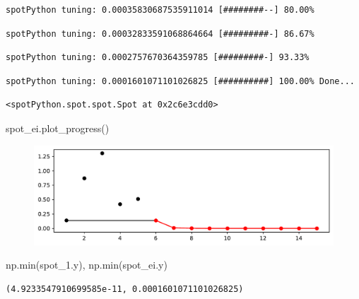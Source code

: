 \documentclass[
  letterpaper,
  DIV=11,
  numbers=noendperiod]{scrreprt}
\newenvironment{Shaded}{\begin{snugshade}}{\end{snugshade}}
\newcommand{\BuiltInTok}[1]{\textcolor[rgb]{0.00,0.23,0.31}{#1}}
\newcommand{\NormalTok}[1]{\textcolor[rgb]{0.00,0.23,0.31}{#1}}
\begin{document}
\begin{verbatim}
spotPython tuning: 0.00035830687535911014 [########--] 80.00% 
\end{verbatim}

\begin{verbatim}
spotPython tuning: 0.00032833591068864664 [#########-] 86.67% 
\end{verbatim}

\begin{verbatim}
spotPython tuning: 0.0002757670364359785 [#########-] 93.33% 
\end{verbatim}

\begin{verbatim}
spotPython tuning: 0.0001601071101026825 [##########] 100.00% Done...
\end{verbatim}

\begin{verbatim}
<spotPython.spot.spot.Spot at 0x2c6e3cdd0>
\end{verbatim}

\begin{Shaded}
\begin{Highlighting}[]
\NormalTok{spot\_ei.plot\_progress()}
\end{Highlighting}
\end{Shaded}

\begin{figure}[H]

{\centering \includegraphics{012_num_spot_ei_files/figure-pdf/cell-19-output-1.pdf}

}

\end{figure}

\begin{Shaded}
\begin{Highlighting}[]
\NormalTok{np.}\BuiltInTok{min}\NormalTok{(spot\_1.y), np.}\BuiltInTok{min}\NormalTok{(spot\_ei.y)}
\end{Highlighting}
\end{Shaded}

\begin{verbatim}
(4.9233547910699585e-11, 0.0001601071101026825)
\end{verbatim}
\end{document}
